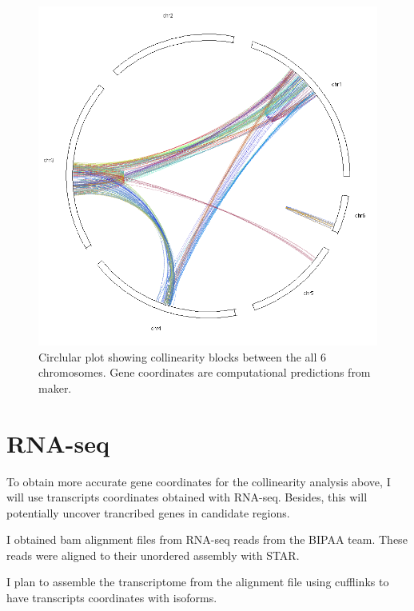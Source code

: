 \documentclass[10pt,a4paper]{report}
\begin{document}
\begin{itemize}
\begin{figure}[h!]
\begin{center}
\includegraphics[width=\textwidth]{homology/LF_MCScanX_circle_all_makergenes.png}
\caption{Circlular plot showing collinearity blocks between the all 6 chromosomes. Gene coordinates are computational predictions from maker.}
\label{collin_all_maker}
\end{center}
\end{figure}

\section{RNA-seq}

To obtain more accurate gene coordinates for the collinearity analysis above, I will use transcripts coordinates obtained with RNA-seq. Besides, this will potentially uncover trancribed genes in candidate regions.

I obtained bam alignment files from RNA-seq reads from the BIPAA team. These reads were aligned to their unordered assembly with STAR. 

I plan to assemble the transcriptome from the alignment file using cufflinks to have transcripts coordinates with isoforms.


\end{itemize}
\end{document}
